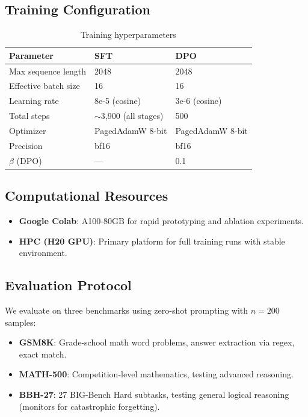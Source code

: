 \documentclass{article}
\begin{document}
\subsection{Training Configuration}

\begin{table}[H]
\centering
\caption{Training hyperparameters}
\begin{tabular}{lll}
\toprule
\textbf{Parameter} & \textbf{SFT} & \textbf{DPO} \\
\midrule
Max sequence length & 2048 & 2048 \\
Effective batch size & 16 & 16 \\
Learning rate & 8e-5 (cosine) & 3e-6 (cosine) \\
Total steps & $\sim$3,900 (all stages) & 500 \\
Optimizer & PagedAdamW 8-bit & PagedAdamW 8-bit \\
Precision & bf16 & bf16 \\
$\beta$ (DPO) & --- & 0.1 \\
\bottomrule
\end{tabular}
\end{table}

\subsection{Computational Resources}
\begin{itemize}[noitemsep]
    \item \textbf{Google Colab}: A100-80GB for rapid prototyping and ablation experiments.
    \item \textbf{HPC (H20 GPU)}: Primary platform for full training runs with stable environment.
\end{itemize}

\subsection{Evaluation Protocol}
We evaluate on three benchmarks using zero-shot prompting with $n=200$ samples:
\begin{itemize}[noitemsep]
    \item \textbf{GSM8K}: Grade-school math word problems, answer extraction via regex, exact match.
    \item \textbf{MATH-500}: Competition-level mathematics, testing advanced reasoning.
    \item \textbf{BBH-27}: 27 BIG-Bench Hard subtasks, testing general logical reasoning (monitors for catastrophic forgetting).
\end{itemize}
\end{document}
